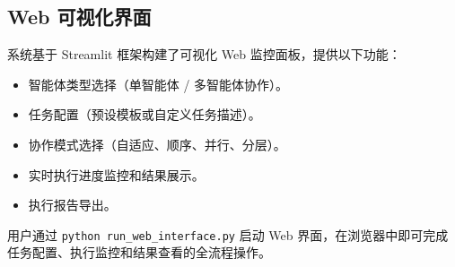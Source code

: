 \subsection{Web 可视化界面}

系统基于 Streamlit 框架构建了可视化 Web 监控面板，提供以下功能：
\begin{itemize}
    \item 智能体类型选择（单智能体 / 多智能体协作）。
    \item 任务配置（预设模板或自定义任务描述）。
    \item 协作模式选择（自适应、顺序、并行、分层）。
    \item 实时执行进度监控和结果展示。
    \item 执行报告导出。
\end{itemize}

用户通过 \texttt{python run\_web\_interface.py} 启动 Web 界面，在浏览器中即可完成任务配置、执行监控和结果查看的全流程操作。
